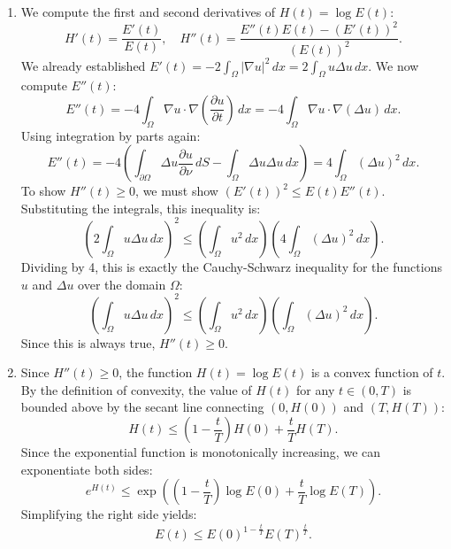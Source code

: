 \documentclass{article}
\begin{document}
\begin{enumerate}[label=\fbox{\arabic*}]
\begin{enumerate}[label=(\arabic*)]
          \item We compute the first and second derivatives of $H(t) = \log E(t)$:
          \[
            H'(t) = \frac{E'(t)}{E(t)}, \quad H''(t) = \frac{E''(t) E(t) - (E'(t))^2}{(E(t))^2}.
          \]
          We already established $E'(t) = -2 \int_\Omega |\nabla u|^2 \, dx = 2 \int_\Omega u \Delta u \, dx$. We now compute $E''(t)$:
          \[
            E''(t) = -4 \int_\Omega \nabla u \cdot \nabla \left(\frac{\partial u}{\partial t}\right) \, dx = -4 \int_\Omega \nabla u \cdot \nabla (\Delta u) \, dx.
          \]
          Using integration by parts again:
          \[
            E''(t) = -4 \left( \int_{\partial \Omega} \Delta u \frac{\partial u}{\partial \nu} \, dS - \int_\Omega \Delta u \Delta u \, dx \right) = 4 \int_\Omega (\Delta u)^2 \, dx.
          \]
          To show $H''(t) \ge 0$, we must show $(E'(t))^2 \le E(t) E''(t)$. Substituting the integrals, this inequality is:
          \[
            \left( 2 \int_\Omega u \Delta u \, dx \right)^2 \le \left( \int_\Omega u^2 \, dx \right) \left( 4 \int_\Omega (\Delta u)^2 \, dx \right).
          \]
          Dividing by 4, this is exactly the Cauchy-Schwarz inequality for the functions $u$ and $\Delta u$ over the domain $\Omega$:
          \[
            \left( \int_\Omega u \Delta u \, dx \right)^2 \le \left( \int_\Omega u^2 \, dx \right) \left( \int_\Omega (\Delta u)^2 \, dx \right).
          \]
          Since this is always true, $H''(t) \ge 0$.
          
          \item Since $H''(t) \ge 0$, the function $H(t) = \log E(t)$ is a convex function of $t$. By the definition of convexity, the value of $H(t)$ for any $t \in (0, T)$ is bounded above by the secant line connecting $(0, H(0))$ and $(T, H(T))$:
          \[
            H(t) \le \left( 1 - \frac{t}{T} \right) H(0) + \frac{t}{T} H(T).
          \]
          Since the exponential function is monotonically increasing, we can exponentiate both sides:
          \[
            e^{H(t)} \le \exp\left( \left( 1 - \frac{t}{T} \right) \log E(0) + \frac{t}{T} \log E(T) \right).
          \]
          Simplifying the right side yields:
          \[
            E(t) \le E(0)^{1 - \frac{t}{T}} E(T)^{\frac{t}{T}}.
          \]
        \end{enumerate}


\end{enumerate}
\end{document}
